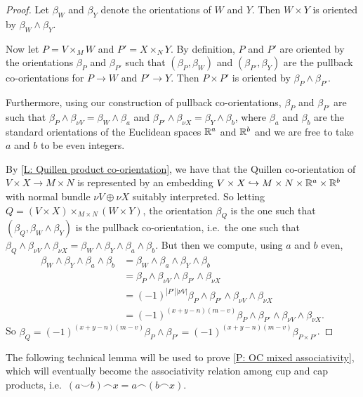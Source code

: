 \begin{proof}
	Let $\beta_W$ and $\beta_Y$ denote the orientations of $W$ and $Y$.
	Then $W \times Y$ is oriented by $\beta_W \wedge \beta_Y$.

	Now let $P = V \times_M W$ and $P' = X \times_N Y$.
	By definition, $P$ and $P'$ are oriented by the orientations $\beta_P$ and $\beta_{P'}$ such that $(\beta_P,\beta_W)$ and $(\beta_{P'},\beta_Y)$ are the pullback co-orientations for $P \to W$ and $P' \to Y$.
	Then $P \times P'$ is oriented by $\beta_P \wedge \beta_{P'}$.

	Furthermore, using our construction of pullback co-orientations, $\beta_P$ and $\beta_{P'}$ are such that $\beta_P \wedge \beta_{\nu V} = \beta_W \wedge \beta_a$ and $\beta_{P'} \wedge \beta_{\nu X} = \beta_Y \wedge \beta_b$, where $\beta_a$ and $\beta_b$ are the standard orientations of the Euclidean spaces $\mathbb{R}^a$ and $\mathbb{R}^b$ and we are free to take $a$ and $b$ to be even integers.

	By \cref{L: Quillen product co-orientation}, we have that the Quillen co-orientation of $V \times X \to M \times N$ is represented by an embedding $V \times X \hookrightarrow M \times N \times \mathbb{R}^a \times \mathbb{R}^b$ with normal bundle $\nu V \oplus \nu X$ suitably interpreted.
	So letting $Q = (V \times X)\times_{M \times N} (W \times Y)$, the orientation $\beta_Q$ is the one such that $(\beta_Q,\beta_W \wedge \beta_Y)$ is the pullback co-orientation, i.e.\ the one such that $\beta_Q \wedge \beta_{\nu V} \wedge \beta_{\nu X} = \beta_W \wedge \beta_Y \wedge \beta_a \wedge \beta_b$.
	But then we compute, using $a$ and $b$ even,
	\begin{align*}
		\beta_W \wedge \beta_Y \wedge \beta_a \wedge \beta_b& = \beta_W \wedge \beta_a \wedge \beta_Y \wedge \beta_b\\
		& = \beta_P \wedge \beta_{\nu V} \wedge \beta_{P'} \wedge \beta_{\nu X}\\
		& = (-1)^{|P'||\nu V|}\beta_P \wedge \beta_{P'} \wedge \beta_{\nu V} \wedge \beta_{\nu X}\\
		& = (-1)^{(x+y-n)(m-v)}\beta_P \wedge \beta_{P'} \wedge \beta_{\nu V} \wedge \beta_{\nu X}.
	\end{align*}
	So $\beta_Q = (-1)^{(x+y-n)(m-v)}\beta_P \wedge \beta_{P'} = (-1)^{(x+y-n)(m-v)}\beta_{P \times P'}$.
\end{proof}

The following technical lemma will be used to prove \cref{P: OC mixed associativity}, which will eventually become the associativity relation among cup and cap products, i.e.\ $(a \smile b) \frown x = a \frown (b \frown x)$.

